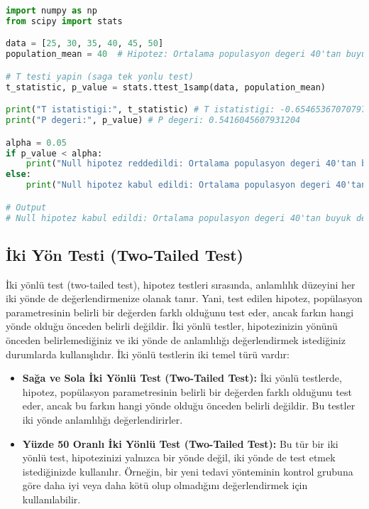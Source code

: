 \begin{lstlisting}[language=Python]
import numpy as np
from scipy import stats

data = [25, 30, 35, 40, 45, 50]
population_mean = 40  # Hipotez: Ortalama populasyon degeri 40'tan buyuktur.

# T testi yapin (saga tek yonlu test)
t_statistic, p_value = stats.ttest_1samp(data, population_mean)

print("T istatistigi:", t_statistic) # T istatistigi: -0.6546536707079772
print("P degeri:", p_value) # P degeri: 0.5416045607931204

alpha = 0.05
if p_value < alpha:
    print("Null hipotez reddedildi: Ortalama populasyon degeri 40'tan buyuktur.")
else:
    print("Null hipotez kabul edildi: Ortalama populasyon degeri 40'tan buyuk degildir.")

# Output
# Null hipotez kabul edildi: Ortalama populasyon degeri 40'tan buyuk degildir.
\end{lstlisting}

\subsection{İki Yön Testi (Two-Tailed Test)}
İki yönlü test (two-tailed test), hipotez testleri sırasında, anlamlılık düzeyini her iki yönde de değerlendirmenize olanak tanır. Yani, test edilen hipotez, popülasyon parametresinin belirli bir değerden farklı olduğunu test eder, ancak farkın hangi yönde olduğu önceden belirli değildir. İki yönlü testler, hipotezinizin yönünü önceden belirlemediğiniz ve iki yönde de anlamlılığı değerlendirmek istediğiniz durumlarda kullanışlıdır. İki yönlü testlerin iki temel türü vardır:

\begin{itemize}
    \item \textbf{Sağa ve Sola İki Yönlü Test (Two-Tailed Test):} İki yönlü testlerde, hipotez, popülasyon parametresinin belirli bir değerden farklı olduğunu test eder, ancak bu farkın hangi yönde olduğu önceden belirli değildir. Bu testler iki yönde anlamlılığı değerlendirirler.
    \item \textbf{Yüzde 50 Oranlı İki Yönlü Test (Two-Tailed Test):} Bu tür bir iki yönlü test, hipotezinizi yalnızca bir yönde değil, iki yönde de test etmek istediğinizde kullanılır. Örneğin, bir yeni tedavi yönteminin kontrol grubuna göre daha iyi veya daha kötü olup olmadığını değerlendirmek için kullanılabilir.
\end{itemize}


